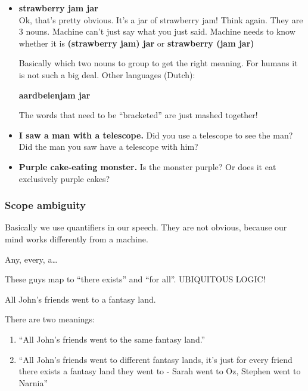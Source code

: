 \begin{itemize}
	\item \textbf{strawberry jam jar}\\ 
	Ok, that's pretty obvious. It's a jar of strawberry jam! Think again. They 
	are 3 nouns. Machine can't just say what you just said. Machine needs to 
	know whether it is \textbf{(strawberry jam) jar} or \textbf{strawberry (jam 
	jar)}

	Basically which two nouns to group to get the right meaning. For humans it 
	is not such a big deal. Other languages (Dutch):

	\textbf{aardbeienjam jar}

	The words that need to be ``bracketed'' are just mashed together!

	\item \textbf{I saw a man with a telescope.} Did you use a telescope to see 
	the man? Did the man you saw have a telescope with him?
	\item \textbf{Purple cake-eating monster.} Is the monster purple? Or does it
	 eat exclusively purple cakes?
\end{itemize}


\subsubsection{Scope ambiguity}


Basically we use quantifiers in our speech. They are not obvious, because our
mind works differently from a machine.

Any, every, a\ldots

These guys map to ``there exists'' and ``for all''. UBIQUITOUS LOGIC!

All John's friends went to a fantasy land.

There are two meanings:

\begin{enumerate}
	\item ``All John's friends went to the same fantasy land.''
	\item ``All John's friends went to different fantasy lands, it's just for 
	every friend there exists a fantasy land they went to - Sarah went to Oz, 
	Stephen went to Narnia''
\end{enumerate}

